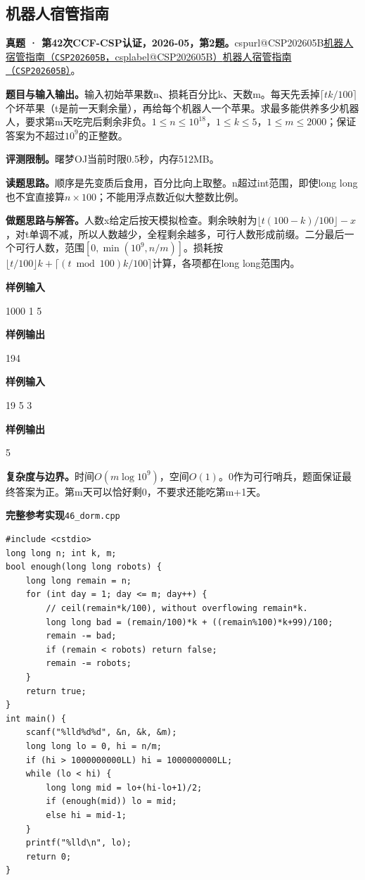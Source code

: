 \documentclass[UTF8,11pt,a4paper,fontset=none]{ctexart}
\makeatletter
\newcommand{\csp}[2]{\ifcsname cspurl@#1\endcsname\href{\csname cspurl@#1\endcsname}{#2（\texttt{#1}，\csname csplabel@#1\endcsname）}\else\href{https://oj.shumeng.tech/p/#1}{#2（\texttt{#1}）}\fi}
\makeatother
\begin{document}
\subsection{机器人宿管指南}
\textbf{真题 · 第42次CCF-CSP认证，2026-05，第2题。}\csp{CSP202605B}{机器人宿管指南}。

\noindent\textbf{题目与输入输出。}输入初始苹果数n、损耗百分比k、天数m。每天先丢掉$\lceil tk/100\rceil$个坏苹果（t是前一天剩余量），再给每个机器人一个苹果。求最多能供养多少机器人，要求第m天吃完后剩余非负。$1\le n\le10^{18}$，$1\le k\le5$，$1\le m\le2000$；保证答案为不超过$10^9$的正整数。

\noindent\textbf{评测限制。}曙梦OJ当前时限0.5秒，内存512MB。

\noindent\textbf{读题思路。}顺序是先变质后食用，百分比向上取整。n超过int范围，即使long long也不宜直接算$n\times100$；不能用浮点数近似大整数比例。

\noindent\textbf{做题思路与解答。}人数x给定后按天模拟检查。剩余映射为$\lfloor t(100-k)/100\rfloor-x$，对t单调不减，所以人数越少，全程剩余越多，可行人数形成前缀。二分最后一个可行人数，范围$[0,\min(10^9,n/m)]$。损耗按$\lfloor t/100\rfloor k+\lceil (t\bmod100)k/100\rceil$计算，各项都在long long范围内。
\begin{tcolorbox}[samplebox,title={输入输出样例}]
\textbf{样例输入}
\begin{Sample}
1000 1 5
\end{Sample}
\tcblower
\textbf{样例输出}
\begin{Sample}
194
\end{Sample}
\end{tcolorbox}
\begin{tcolorbox}[samplebox,title={输入输出样例}]
\textbf{样例输入}
\begin{Sample}
19 5 3
\end{Sample}
\tcblower
\textbf{样例输出}
\begin{Sample}
5
\end{Sample}
\end{tcolorbox}

\noindent\textbf{复杂度与边界。}时间$O(m\log 10^9)$，空间$O(1)$。0作为可行哨兵，题面保证最终答案为正。第m天可以恰好剩0，不要求还能吃第m+1天。
\par\noindent\begin{minipage}{\linewidth}
\textbf{完整参考实现}\quad\texttt{46\_dorm.cpp}
\begin{lstlisting}
#include <cstdio>
long long n; int k, m;
bool enough(long long robots) {
    long long remain = n;
    for (int day = 1; day <= m; day++) {
        // ceil(remain*k/100), without overflowing remain*k.
        long long bad = (remain/100)*k + ((remain%100)*k+99)/100;
        remain -= bad;
        if (remain < robots) return false;
        remain -= robots;
    }
    return true;
}
int main() {
    scanf("%lld%d%d", &n, &k, &m);
    long long lo = 0, hi = n/m;
    if (hi > 1000000000LL) hi = 1000000000LL;
    while (lo < hi) {
        long long mid = lo+(hi-lo+1)/2;
        if (enough(mid)) lo = mid;
        else hi = mid-1;
    }
    printf("%lld\n", lo);
    return 0;
}
\end{lstlisting}
\end{minipage}\par
\end{document}
